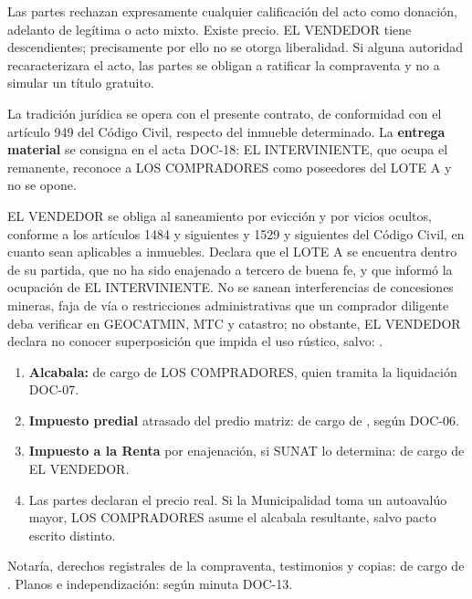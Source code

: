 \documentclass[12pt,a4paper]{article}
\begin{document}
Las partes rechazan expresamente cualquier calificación del acto como donación, adelanto de legítima o acto mixto. Existe precio. EL VENDEDOR tiene descendientes; precisamente por ello no se otorga liberalidad. Si alguna autoridad recaracterizara el acto, las partes se obligan a ratificar la compraventa y no a simular un título gratuito.

La tradición jurídica se opera con el presente contrato, de conformidad con el artículo 949 del Código Civil, respecto del inmueble determinado. La \textbf{entrega material} se consigna en el acta DOC-18: EL INTERVINIENTE, que ocupa el remanente, reconoce a LOS COMPRADORES como poseedores del LOTE A y no se opone.

EL VENDEDOR se obliga al saneamiento por evicción y por vicios ocultos, conforme a los artículos 1484 y siguientes y 1529 y siguientes del Código Civil, en cuanto sean aplicables a inmuebles. Declara que el LOTE A se encuentra dentro de su partida, que no ha sido enajenado a tercero de buena fe, y que informó la ocupación de EL INTERVINIENTE. No se sanean interferencias de concesiones mineras, faja de vía o restricciones administrativas que un comprador diligente deba verificar en GEOCATMIN, MTC y catastro; no obstante, EL VENDEDOR declara no conocer superposición que impida el uso rústico, salvo: .

\begin{enumerate}[leftmargin=1.15cm]
\item \textbf{Alcabala:} de cargo de LOS COMPRADORES, quien tramita la liquidación DOC-07.
\item \textbf{Impuesto predial} atrasado del predio matriz: de cargo de , según DOC-06.
\item \textbf{Impuesto a la Renta} por enajenación, si SUNAT lo determina: de cargo de EL VENDEDOR.
\item Las partes declaran el precio real. Si la Municipalidad toma un autoavalúo mayor, LOS COMPRADORES asume el alcabala resultante, salvo pacto escrito distinto.
\end{enumerate}

Notaría, derechos registrales de la compraventa, testimonios y copias: de cargo de . Planos e independización: según minuta DOC-13.
\end{document}
